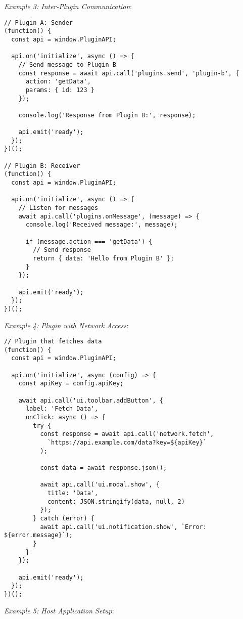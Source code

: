 \documentclass[11pt]{article}
\begin{document}
\emph{Example 3: Inter-Plugin Communication}:

\begin{verbatim}
// Plugin A: Sender
(function() {
  const api = window.PluginAPI;
  
  api.on('initialize', async () => {
    // Send message to Plugin B
    const response = await api.call('plugins.send', 'plugin-b', {
      action: 'getData',
      params: { id: 123 }
    });
    
    console.log('Response from Plugin B:', response);
    
    api.emit('ready');
  });
})();

// Plugin B: Receiver
(function() {
  const api = window.PluginAPI;
  
  api.on('initialize', async () => {
    // Listen for messages
    await api.call('plugins.onMessage', (message) => {
      console.log('Received message:', message);
      
      if (message.action === 'getData') {
        // Send response
        return { data: 'Hello from Plugin B' };
      }
    });
    
    api.emit('ready');
  });
})();
\end{verbatim}

\emph{Example 4: Plugin with Network Access}:

\begin{verbatim}
// Plugin that fetches data
(function() {
  const api = window.PluginAPI;
  
  api.on('initialize', async (config) => {
    const apiKey = config.apiKey;
    
    await api.call('ui.toolbar.addButton', {
      label: 'Fetch Data',
      onClick: async () => {
        try {
          const response = await api.call('network.fetch', 
            `https://api.example.com/data?key=${apiKey}`
          );
          
          const data = await response.json();
          
          await api.call('ui.modal.show', {
            title: 'Data',
            content: JSON.stringify(data, null, 2)
          });
        } catch (error) {
          await api.call('ui.notification.show', `Error: ${error.message}`);
        }
      }
    });
    
    api.emit('ready');
  });
})();
\end{verbatim}

\emph{Example 5: Host Application Setup}:
\end{document}
